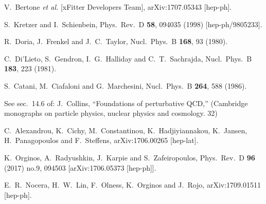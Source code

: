 \documentclass[letter,11pt]{article}
\begin{document}
\begin{thebibliography}{99}
  V.~Bertone {\it et al.} [xFitter Developers Team],
  arXiv:1707.05343 [hep-ph].

  S.~Kretzer and I.~Schienbein,
  Phys.\ Rev.\ D {\bf 58}, 094035 (1998)
  [hep-ph/9805233].
  
  R.~Doria, J.~Frenkel and J.~C.~Taylor,
  Nucl.\ Phys.\ B {\bf 168}, 93 (1980).

  C.~Di'Lieto, S.~Gendron, I.~G.~Halliday and C.~T.~Sachrajda,
  Nucl.\ Phys.\ B {\bf 183}, 223 (1981).

  S.~Catani, M.~Ciafaloni and G.~Marchesini,
  Nucl.\ Phys.\ B {\bf 264}, 588 (1986).

 See sec.~14.6 of: J.~Collins,
  ``Foundations of perturbative QCD,''
  (Cambridge monographs on particle physics, nuclear physics and cosmology. 32)
  
  C.~Alexandrou, K.~Cichy, M.~Constantinou, K.~Hadjiyiannakou, K.~Jansen, H.~Panagopoulos and F.~Steffens,
  arXiv:1706.00265 [hep-lat].
  
  K.~Orginos, A.~Radyushkin, J.~Karpie and S.~Zafeiropoulos,
  Phys.\ Rev.\ D {\bf 96} (2017) no.9,  094503
  [arXiv:1706.05373 [hep-ph]].

  E.~R.~Nocera, H.~W.~Lin, F.~Olness, K.~Orginos and J.~Rojo,
  arXiv:1709.01511 [hep-ph].


\end{thebibliography}
\end{document}

